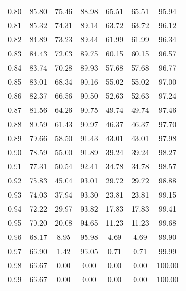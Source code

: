 \begin{tabular}{|c|c|c|c|c|c|c|}
      0.80 &     85.80 &     75.46 &      88.98 &   65.51 &      65.51 &         95.94 \\
      0.81 &     85.32 &     74.31 &      89.14 &   63.72 &      63.72 &         96.12 \\
      0.82 &     84.89 &     73.23 &      89.44 &   61.99 &      61.99 &         96.34 \\
      0.83 &     84.43 &     72.03 &      89.75 &   60.15 &      60.15 &         96.57 \\
      0.84 &     83.74 &     70.28 &      89.93 &   57.68 &      57.68 &         96.77 \\
      0.85 &     83.01 &     68.34 &      90.16 &   55.02 &      55.02 &         97.00 \\
      0.86 &     82.37 &     66.56 &      90.50 &   52.63 &      52.63 &         97.24 \\
      0.87 &     81.56 &     64.26 &      90.75 &   49.74 &      49.74 &         97.46 \\
      0.88 &     80.59 &     61.43 &      90.97 &   46.37 &      46.37 &         97.70 \\
      0.89 &     79.66 &     58.50 &      91.43 &   43.01 &      43.01 &         97.98 \\
      0.90 &     78.59 &     55.00 &      91.89 &   39.24 &      39.24 &         98.27 \\
      0.91 &     77.31 &     50.54 &      92.41 &   34.78 &      34.78 &         98.57 \\
      0.92 &     75.83 &     45.04 &      93.01 &   29.72 &      29.72 &         98.88 \\
      0.93 &     74.03 &     37.94 &      93.30 &   23.81 &      23.81 &         99.15 \\
      0.94 &     72.22 &     29.97 &      93.82 &   17.83 &      17.83 &         99.41 \\
      0.95 &     70.20 &     20.08 &      94.65 &   11.23 &      11.23 &         99.68 \\
      0.96 &     68.17 &      8.95 &      95.98 &    4.69 &       4.69 &         99.90 \\
      0.97 &     66.90 &      1.42 &      96.05 &    0.71 &       0.71 &         99.99 \\
      0.98 &     66.67 &      0.00 &       0.00 &    0.00 &       0.00 &        100.00 \\
      0.99 &     66.67 &      0.00 &       0.00 &    0.00 &       0.00 &        100.00 \\
\bottomrule
\end{tabular}
